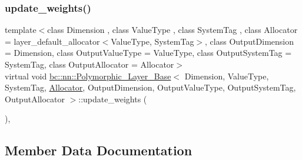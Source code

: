 \mbox{\label{structbc_1_1nn_1_1Polymorphic__Layer__Base_ac4e83d85cab03ae8ac5d918fe4e08df6}} 
\subsubsection{\texorpdfstring{update\+\_\+weights()}{update\_weights()}\hspace{0.1cm}{\footnotesize\ttfamily [2/2]}}
{\footnotesize\ttfamily template$<$class Dimension , class Value\+Type , class System\+Tag , class Allocator  = layer\+\_\+default\+\_\+allocator$<$\+Value\+Type, System\+Tag$>$, class Output\+Dimension  = Dimension, class Output\+Value\+Type  = Value\+Type, class Output\+System\+Tag  = System\+Tag, class Output\+Allocator  = Allocator$>$ \\
virtual void \hyperlink{structbc_1_1nn_1_1Polymorphic__Layer__Base}{bc\+::nn\+::\+Polymorphic\+\_\+\+Layer\+\_\+\+Base}$<$ Dimension, Value\+Type, System\+Tag, \hyperlink{classbc_1_1allocators_1_1Allocator}{Allocator}, Output\+Dimension, Output\+Value\+Type, Output\+System\+Tag, Output\+Allocator $>$\+::update\+\_\+weights (\begin{DoxyParamCaption}{ }\end{DoxyParamCaption})\hspace{0.3cm}{\ttfamily [inline]}, {\ttfamily [virtual]}}



\subsection{Member Data Documentation}
\mbox{\label{structbc_1_1nn_1_1Polymorphic__Layer__Base_a871e8bf7f3ea5e729e00c6bb6ae6f769}} 
